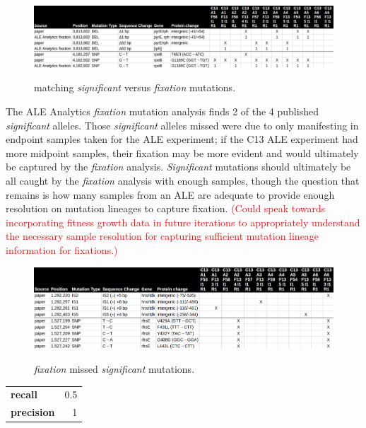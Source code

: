 \documentclass[12pt,final,masters,chapterheads]{ucsd}  %
\newcommand\todo[1]{\textcolor{red}{#1}}
\begin{document}
\begin{figure}[h!]
  \caption{matching \textit{significant} versus \textit{fixation} mutations.}
  \centering
  \includegraphics[width=\textwidth]{c13_matching_fixation_mutations.png}
  \label{fig:c13_matching_fixation_mutations}
\end{figure}

The ALE Analytics \textit{fixation} mutation analysis finds 2 of the 4 published \textit{significant} alleles. Those \textit{significant} alleles missed were due to only manifesting in endpoint samples taken for the ALE experiment; if the C13 ALE experiment had more midpoint samples, their fixation may be more evident and would ultimately be captured by the \textit{fixation} analysis. \textit{Significant} mutations should ultimately be all caught by the \textit{fixation} analysis with enough samples, though the question that remains is how many samples from an ALE are adequate to provide enough resolution on mutation lineages to capture fixation.
\todo{(Could speak towards incorporating fitness growth data in future iterations to appropriately understand the necessary sample resolution for capturing sufficient mutation lineage information for fixations.)}

\begin{figure}[h!]
  \caption{\textit{fixation} missed \textit{significant} mutations.}
  \centering
  \includegraphics[width=\textwidth]{c13_fixation_missed_muts.png}
  \label{fig:c13_missed_fixation_mutations}
\end{figure}

\begin{table}[h!]
\centering
\begin{tabular}{ l r }
  \textbf{recall} & 0.5 \\
  \textbf{precision} & 1 \\
\end{tabular}
\end{table}
\end{document}
